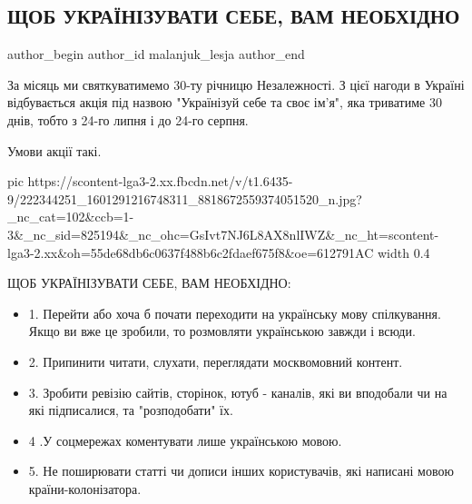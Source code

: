  
 
 
 
 
 
\subsection{ЩОБ УКРАЇНІЗУВАТИ СЕБЕ, ВАМ НЕОБХІДНО}
\label{sec:24_07_2021.fb.malanjuk_lesja.1.ukrainizacia_sebja}
 
\ifcmt
 author_begin
   author_id malanjuk_lesja
 author_end
\fi

За місяць ми святкуватимемо 30-ту річницю Незалежності. З цієї нагоди в Україні відбувається акція під назвою "Українізуй себе та своє ім'я", яка триватиме 30 днів, тобто з 24-го липня і до 24-го серпня.

Умови акції такі.

\ifcmt
  pic https://scontent-lga3-2.xx.fbcdn.net/v/t1.6435-9/222344251_1601291216748311_8818672559374051520_n.jpg?_nc_cat=102&ccb=1-3&_nc_sid=825194&_nc_ohc=GsIvt7NJ6L8AX8nlIWZ&_nc_ht=scontent-lga3-2.xx&oh=55de68db6c0637f488b6c2fdaef675f8&oe=612791AC
  width 0.4
\fi

ЩОБ УКРАЇНІЗУВАТИ СЕБЕ, ВАМ НЕОБХІДНО:

\begin{itemize}
  \item 1. Перейти або хоча б почати переходити на українську мову спілкування. Якщо ви вже це зробили, то розмовляти українською завжди і всюди. 
  \item 2. Припинити читати, слухати, переглядати москвомовний контент.
  \item 3. Зробити ревізію сайтів, сторінок, ютуб - каналів, які ви вподобали чи на які підписалися, та "розподобати" їх. 
  \item 4 .У соцмережах коментувати лише українською мовою. 
  \item 5. Не поширювати статті чи дописи інших користувачів, які написані мовою країни-колонізатора. 
\end{itemize}


